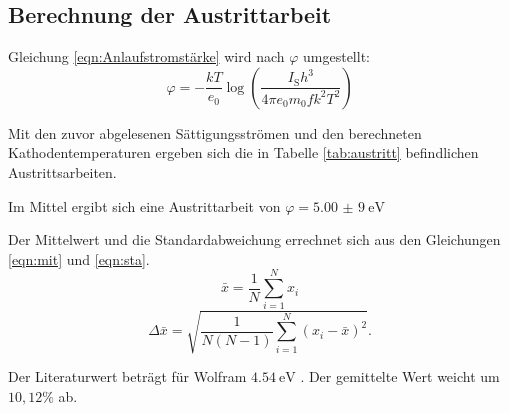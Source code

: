 \subsection{Berechnung der Austrittarbeit}
Gleichung \eqref{eqn:Anlaufstromstärke} wird nach $\varphi$ umgestellt:
\begin{equation}
  \varphi = - \frac{k T}{e_0} \log{\left( \frac{I_\text{S} h^3}{4 \pi e_0 m_0 f k^2 T^2} \right)}
\end{equation}

Mit den zuvor abgelesenen Sättigungsströmen und den berechneten Kathodentemperaturen ergeben sich die in Tabelle \ref{tab:austritt}
befindlichen Austrittsarbeiten.


Im Mittel ergibt sich eine Austrittarbeit von $\varphi = \SI{5,00(9)}{\electronvolt}$

Der Mittelwert und die Standardabweichung errechnet sich aus den Gleichungen \eqref{eqn:mit} und \eqref{eqn:sta}.
\begin{equation}
  \bar{x} = \frac{1}{N} \sum_{i=1}^{N} x_i
  \label{eqn:mit}
\end{equation}
\begin{equation}
  \Delta \bar{x} = \sqrt{\frac{1}{N (N - 1)} \sum_{i=1}^{N} (x_i - \bar{x})^2}.
  \label{eqn:sta}
\end{equation}

Der Literaturwert beträgt für Wolfram $\SI{4,54}{\electronvolt}$ \cite{sample2}. Der gemittelte Wert weicht um $10,12 \%$ ab.
